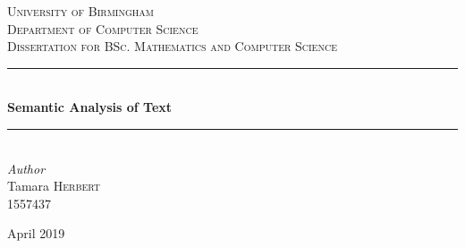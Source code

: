 \documentclass{article}
\begin{document}

\begin{titlepage} %
	\newcommand{\HRule}{\rule{\linewidth}{0.5mm}} %
	
	\center %
	
	
	\textsc{\LARGE University of Birmingham}\\[1.5cm] %
	
	\textsc{\Large Department of Computer Science}\\[0.5cm] %
	
	\textsc{\large Dissertation for BSc. Mathematics and Computer Science}\\[0.5cm] %
	
	
	\HRule\\[0.4cm]
	
	{\huge\bfseries Semantic Analysis of Text}\\[0.4cm] %
	
	\HRule\\[1.5cm]
	

	{\large\textit{Author}}\\
	Tamara \textsc{Herbert} \\ 
	1557437
	
	
	\vfill\vfill\vfill %
	
	{\large April  2019} %
	

\end{titlepage}
\end{document}
